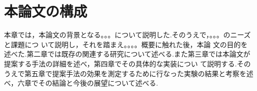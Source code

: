 \section{本論文の構成}
本章では，本論文の背景となる。。。について説明した.そのうえで，。。。のニーズと課題につ いて説明し，それを踏まえ。。。。概要に触れた後，本論 文の目的を述べた.第二章では既存の関連する研究について述べる.また第三章では本論文が提案する手法の詳細を述べ，第四章でその具体的な実装につい て説明する.そのうえで第五章で提案手法の効果を測定するために行なった実験の結果と考察を述べ，六章でその結論と今後の展望について述べる.

